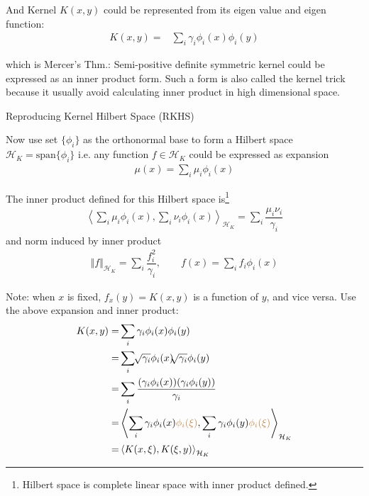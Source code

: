     And Kernel $ K(x,y) $ could be represented from its eigen value and eigen function:
    \begin{align}
        K(x,y)=&\sum_{i}\gamma _i\phi _i(x)\phi _i(y)
    \end{align}

    which is Mercer's Thm.: Semi-positive definite symmetric kernel could be expressed as an inner product form. Such a form is also called the kernel trick because it usually avoid calculating inner product in high dimensional space.
    
\begin{point}
    Reproducing Kernel Hilbert Space (RKHS)
\end{point}
    Now use set $ \{\phi _i\} $ as the orthonormal base to form a Hilbert space $ \mathcal{H}_K=\mathrm{span}\{\phi _i\}  $ i.e. any function $ f\in\mathcal{H}_K $ could be expressed as expansion
    \begin{align}
        \mu (x)=\sum_{i} \mu _i\phi _i(x)
    \end{align}

    The inner product defined for this Hilbert space is\footnote{Hilbert space is complete linear space with inner product defined.}
    \begin{align}
        \left\langle \sum_{i}\mu _i\phi _i(x), \sum_{i}\nu _i\phi _i(x)\right\rangle _{\mathcal{H}_K} = \sum_{i}\dfrac{\mu _i\nu _i}{\gamma _i}
    \end{align}
    and norm induced by inner product
    \begin{align}
        \left\Vert f \right\Vert _{\mathcal{H}_K}=\sum_{i}\dfrac{f_i^2}{\gamma _i},\qquad f(x)=\sum_{i}f_i\phi _i(x)
    \end{align}
    
    
    
    Note: when $ x $ is fixed, $ f_x(y)= K(x,y) $ is a function of $ y $, and vice versa. Use the above expansion and inner product:
    \begin{align}
        K(x,y)=& \sum_{i}\gamma _i\phi _i(x)\phi _i(y)\\
        =&\sum_{i}\sqrt[]{\gamma _i}\phi _i(x)\sqrt[]{\gamma _i}\phi _i(y)\\
        =&\sum_{i}\dfrac{(\gamma _i\phi _i(x))(\gamma _i\phi _i(y))}{\gamma _i}\\
        =&\left\langle \sum_{i}\gamma _i\phi _i(x){\color{brown} \phi _i(\xi )},\sum_{i}\gamma _i\phi _i(y){\color{brown} \phi _i(\xi )} \right\rangle _{\mathcal{H}_K}\\
        =&\left\langle K(x,\xi ),K(\xi ,y) \right\rangle _{\mathcal{H}_K}
    \end{align}

